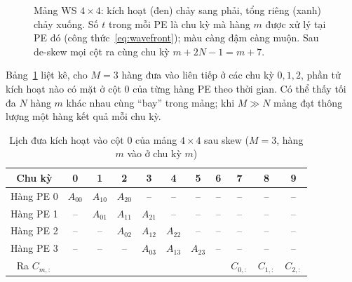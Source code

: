 \begin{figure}[H]
  \centering
  \caption{Mảng WS $4\times4$: kích hoạt (đen) chảy sang phải, tổng riêng (xanh) chảy xuống. Số $t$ trong mỗi PE là chu kỳ mà hàng $m$ được xử lý tại PE đó (công thức~\eqref{eq:wavefront}); màu càng đậm càng muộn. Sau de-skew mọi cột ra cùng chu kỳ $m+2N-1=m+7$.}
  \label{fig:wavefront}
\end{figure}

Bảng~\ref{tab:ws-timing} liệt kê, cho $M=3$ hàng đưa vào liên tiếp ở các chu kỳ $0,1,2$, phần tử kích hoạt nào có mặt ở cột 0 của từng hàng PE theo thời gian. Có thể thấy tối đa $N$ hàng $m$ khác nhau cùng ``bay'' trong mảng; khi $M\gg N$ mảng đạt thông lượng một hàng kết quả mỗi chu kỳ.

\begin{table}[H]
  \centering
  \caption{Lịch đưa kích hoạt vào cột 0 của mảng $4\times4$ sau skew ($M=3$, hàng $m$ vào ở chu kỳ $m$)}
  \label{tab:ws-timing}
  \begin{tabular}{c|cccccccccc}
    \toprule
    Chu kỳ & 0 & 1 & 2 & 3 & 4 & 5 & 6 & 7 & 8 & 9\\
    \midrule
    Hàng PE 0 & $A_{00}$ & $A_{10}$ & $A_{20}$ & -- & -- & -- & -- & -- & -- & --\\
    Hàng PE 1 & -- & $A_{01}$ & $A_{11}$ & $A_{21}$ & -- & -- & -- & -- & -- & --\\
    Hàng PE 2 & -- & -- & $A_{02}$ & $A_{12}$ & $A_{22}$ & -- & -- & -- & -- & --\\
    Hàng PE 3 & -- & -- & -- & $A_{03}$ & $A_{13}$ & $A_{23}$ & -- & -- & -- & --\\
    \midrule
    Ra $C_{m,:}$ & & & & & & & & $C_{0,:}$ & $C_{1,:}$ & $C_{2,:}$\\
    \bottomrule
  \end{tabular}
\end{table}

